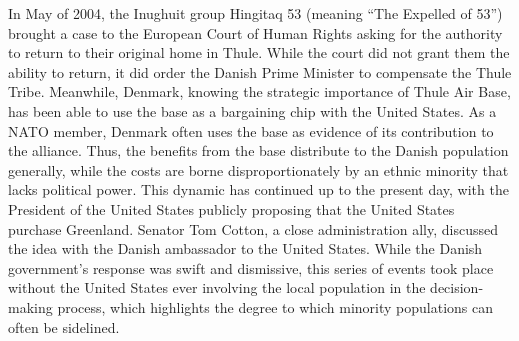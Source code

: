 In May of 2004, the Inughuit group Hingitaq 53 (meaning ``The Expelled of 53'') brought a case to the European Court of Human Rights asking for the authority to return to their original home in Thule. While the court did not grant them the ability to return, it did order the Danish Prime Minister to compensate the Thule Tribe.\cite{Spiermann2004} Meanwhile, Denmark, knowing the strategic importance of Thule Air Base, has been able to use the base as a bargaining chip with the United States. As a NATO member, Denmark often uses the base as evidence of its contribution to the alliance.\cite{Dragsdahl2005} Thus, the benefits from the base distribute to the Danish population generally, while the costs are borne disproportionately by an ethnic minority that lacks political power. This dynamic has continued up to the present day, with the President of the United States publicly proposing that the United States purchase Greenland. Senator Tom Cotton, a close administration ally, discussed the idea with the Danish ambassador to the United States.\cite{hart2019,wu2019} While the Danish government's response was swift and dismissive, this series of events took place without the United States ever involving the local population in the decision-making process, which highlights the degree to which minority populations can often be sidelined. 



